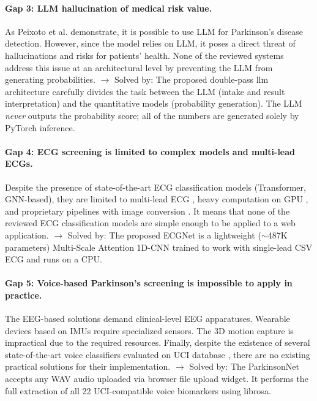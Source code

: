 \paragraph{Gap 3: LLM hallucination of medical risk value.}
As Peixoto et al. \cite{peixoto2024} demonstrate, it is possible to use LLM for Parkinson's disease detection. However, since the model relies on LLM, it poses a direct threat of hallucinations and risks for patients' health. None of the reviewed systems address this issue at an architectural level by preventing the LLM from generating probabilities.
$\rightarrow$ Solved by: The proposed double-pass \ac{llm} architecture carefully divides the task between the LLM (intake and result interpretation) and the quantitative models (probability generation). The LLM \textit{never} outputs the probability score; all of the numbers are generated solely by PyTorch inference.

\paragraph{Gap 4: ECG screening is limited to complex models and multi-lead ECGs.}
Despite the presence of state-of-the-art ECG classification models (Transformer, GNN-based), they are limited to multi-lead ECG \cite{mahajan2024}, heavy computation on GPU \cite{liu2024}, and proprietary pipelines with image conversion \cite{khatar2024}. It means that none of the reviewed ECG classification models are simple enough to be applied to a web application.
$\rightarrow$ Solved by: The proposed ECGNet is a lightweight ($\sim$487K parameters) Multi-Scale Attention 1D-CNN trained to work with single-lead CSV ECG and runs on a CPU.

\paragraph{Gap 5: Voice-based Parkinson's screening is impossible to apply in practice.}
The EEG-based solutions \cite{gao2024} demand clinical-level EEG apparatuses. Wearable devices based on IMUs \cite{hammouda2024} require specialized sensors. The 3D motion capture \cite{wang2024point} is impractical due to the required resources. Finally, despite the existence of several state-of-the-art voice classifiers evaluated on UCI database \cite{deng2023, liu2024}, there are no existing practical solutions for their implementation.
$\rightarrow$ Solved by: The ParkinsonNet accepts any WAV audio uploaded via browser file upload widget. It performs the full extraction of all 22 UCI-compatible voice biomarkers using librosa.

